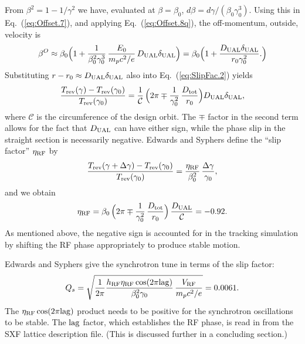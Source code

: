 \documentclass[]{article}
\begin{document}
From $\beta^2=1-1/\gamma^2$ we have, evaluated at $\beta=\beta_0$,
$d\beta=d\gamma/(\beta_0\gamma_0^3)$. Using this in 
Eq.~(\ref{eq:Offset.7}), and applying Eq.~(\ref{eq:Offset.8q}),
the off-momentum, outside, velocity is
%
\begin{equation}
\beta^O
 \approx
\beta_0
\Big(
1 + \frac{1}{\beta^2_0\gamma_0^3}\,
\frac{E_0}{m_pc^2/e}\,
D_{\rm UAL}\delta_{\rm UAL}
\Big)
 =
\beta_0
\Big(
1 + \frac{D_{\rm UAL}\delta_{\rm UAL}}{r_0\gamma_0^2}.
\Big)
\label{eq:SlipFac.3}
\end{equation}
%
Substituting $r-r_0\approx D_{\rm UAL}\delta_{\rm UAL}$ 
also into Eq.~(\ref{eq:SlipFac.2}) yields
%
\begin{equation}
\frac{T_{\rm rev}(\gamma) - T_{\rm rev}(\gamma_0)}{T_{\rm rev}(\gamma_0)}
  =
\frac{1}{\mathcal{C}}\,
\Big(
2\pi
 \mp
\frac{1}{\gamma_0^2}\,\frac{D_{\rm tot}}{r_0}
\Big)
D_{\rm UAL}\delta_{\rm UAL},
\label{eq:SlipFac.4p}
\end{equation}
%
where $\mathcal{C}$ is the circumference of the design orbit. The $\mp$
factor in the second term allows for the fact that $D_{\rm UAL}$
can have either sign, while the phase slip in the straight section
is necessarily negative.
Edwards and Syphers\cite{EdwSyph} define the ``slip factor'' $\eta_{\rm RF}$
by
%
\begin{equation}
\frac{T_{\rm rev}(\gamma+\Delta\gamma)-T_{\rm rev}(\gamma_0)}{T_{\rm rev}(\gamma_0)}
 =
\frac{\eta_{\rm RF}}{\beta_0^2}\,
\frac{\Delta\gamma}{\gamma_0},
\label{eq:SlipFac.5}
\end{equation}
%
and we obtain
%
\begin{equation}
\eta_{\rm RF}
 =
\beta_0\,
\Big(
2\pi
 \mp
\frac{1}{\gamma_0^2}\,\frac{D_{\rm tot}}{r_0}
\Big)\,
\frac{D_{\rm UAL}}{\mathcal{C}}
 =
-0.92.
\label{eq:SlipFac.6}
\end{equation}
%
As mentioned above, the negative sign is accounted for in the
tracking simulation by shifting the RF phase appropriately
to produce stable motion.

Edwards and Syphers give the synchrotron tune in terms of the slip
factor:
%
\begin{equation}
Q_s 
 =
\sqrt{
\frac{1}{2\pi}
\frac{h_{\rm RF}\eta_{\rm RF}\cos(2\pi{\rm lag})}{\beta_0^2\gamma_0}\,
\frac{V_{\rm RF}}{m_pc^2/e}
}
 =
0.0061.
\label{eq:SlipFac.7m}
\end{equation}
%
The $\eta_{\rm RF}\cos(2\pi{\rm lag})$ product needs to be positive for 
the synchrotron oscillations to be stable. The ${\rm lag}$
factor, which establishes the RF phase, is read in from the SXF
lattice description file. (This is discussed further in a 
concluding section.)
\end{document}
